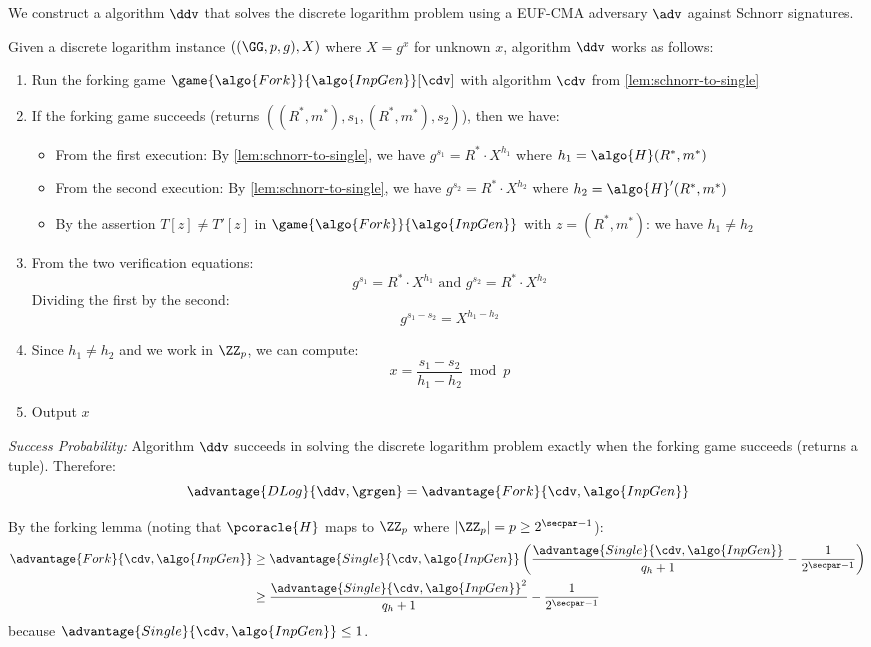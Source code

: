 \ifsolutions
\begin{mysolution}
  We construct a \ppt algorithm $\ddv$ that solves the discrete logarithm problem using a \ppt EUF-CMA adversary $\adv$ against Schnorr signatures.
  
  Given a discrete logarithm instance $((\GG, p, g), X)$ where $X = g^x$ for unknown $x$, algorithm $\ddv$ works as follows:
  \begin{enumerate}
    \item Run the forking game $\game{\algo{Fork}}{\algo{InpGen}}[\cdv]$ with algorithm $\cdv$ from \autoref{lem:schnorr-to-single}
    \item If the forking game succeeds (returns $((R^*, m^*), s_1, (R^*, m^*), s_2)$), then we have:
    \begin{itemize}
      \item From the first execution: By \autoref{lem:schnorr-to-single}, we have $g^{s_1} = R^* \cdot X^{h_1}$ where $h_1 = \algo{H}(R^*, m^*)$
      \item From the second execution: By \autoref{lem:schnorr-to-single}, we have $g^{s_2} = R^* \cdot X^{h_2}$ where $h_2 = \algo{H}'(R^*, m^*)$
      \item By the assertion $T[z] \neq T'[z]$ in $\game{\algo{Fork}}{\algo{InpGen}}$ with $z = (R^*, m^*)$: we have $h_1 \neq h_2$
    \end{itemize}
    \item From the two verification equations:
    \[
      g^{s_1} = R^* \cdot X^{h_1} \text{ and } g^{s_2} = R^* \cdot X^{h_2}
    \]
    Dividing the first by the second:
    \[
      g^{s_1 - s_2} = X^{h_1 - h_2}
    \]
    \item Since $h_1 \neq h_2$ and we work in $\ZZ_p$, we can compute:
    \[
      x = \frac{s_1 - s_2}{h_1 - h_2} \bmod p
    \]
    \item Output $x$
  \end{enumerate}
  
  \emph{Success Probability:} Algorithm $\ddv$ succeeds in solving the discrete logarithm problem exactly when the forking game succeeds (returns a tuple). Therefore:
  \[
    \advantage{DLog}{\ddv, \grgen} = \advantage{Fork}{\cdv, \algo{InpGen}}
  \]
  
  By the forking lemma (noting that $\pcoracle{H}$ maps to $\ZZ_p$ where $|\ZZ_p| = p \geq 2^{\secpar-1}$):
  \begin{align*}
    \advantage{Fork}{\cdv, \algo{InpGen}} &\geq \advantage{Single}{\cdv, \algo{InpGen}} \left( \frac{\advantage{Single}{\cdv, \algo{InpGen}}}{q_h + 1} - \frac{1}{2^{\secpar-1}} \right)\\
    &\geq  \frac{\advantage{Single}{\cdv, \algo{InpGen}}^2}{q_h + 1} - \frac{1}{2^{\secpar-1}}\\
  \end{align*}
  because $\advantage{Single}{\cdv, \algo{InpGen}} \leq 1$.
  

\end{mysolution}
